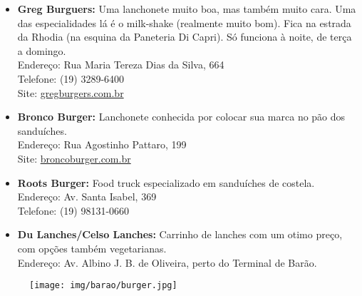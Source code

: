 \begin{itemize}
    \item   \textbf{Greg Burguers:} Uma lanchonete muito boa, mas também muito
        cara.  Uma das especialidades lá é o milk-shake (realmente muito bom).
        Fica na estrada da Rhodia (na esquina da Paneteria Di Capri). Só
        funciona à noite, de terça a domingo.
        \\Endereço: Rua Maria Tereza Dias da Silva, 664
        \\Telefone: (19) 3289-6400
        \\Site: \url{gregburgers.com.br}
    
    \item	\textbf{Bronco Burger:} Lanchonete conhecida por colocar sua marca
		no pão dos sanduíches.
		\\Endereço: Rua Agostinho Pattaro, 199
		\\Site: \url{broncoburger.com.br}
	
	\item	\textbf{Roots Burger:} Food truck especializado em sanduíches de
		costela.
		\\Endereço: Av. Santa Isabel, 369
		\\Telefone: (19) 98131-0660
	
	\item	\textbf{Du Lanches/Celso Lanches:} Carrinho de lanches com um otimo
		preço, com opções também vegetarianas.
		\\Endereço: Av. Albino J. B. de Oliveira, perto do Terminal de Barão. 
		
\end{itemize}

\begin{figure}[h!]
    \centering
    \texttt{[image: img/barao/burger.jpg]}
\end{figure}

